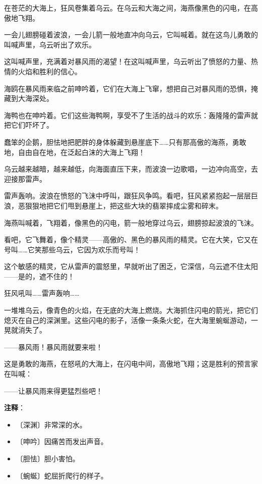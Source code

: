 \documentclass[12pt,UTF-8,openany]{ctexbook}
\begin{document}
\begin{normalsize}
    
    在苍茫的大海上，狂风卷集着乌云。在乌云和大海之间，海燕像黑色的闪电，在高傲地飞翔。
    
    一会儿翅膀碰着波浪，一会儿箭一般地直冲向乌云，它叫喊着。就在这鸟儿勇敢的叫喊声里，乌云听出了欢乐。
    
    这叫喊声里，充满着对暴风雨的渴望！在这叫喊声里，乌云听出了愤怒的力量、热情的火焰和胜利的信心。
    
    海鸥在暴风雨来临之前呻吟着，它们在大海上飞窜，想把自己对暴风雨的恐惧，掩藏到大海深处。
    
    海鸭也在呻吟着。它们这些海鸭啊，享受不了生活的战斗的欢乐：轰隆隆的雷声就把它们吓坏了。
    
    蠢笨的企鹅，胆怯地把肥胖的身体躲藏到悬崖底下……只有那高傲的海燕，勇敢地，自由自在地，在泛起白沫的大海上飞翔！
    
    乌云越来越暗，越来越低，向海面直压下来，而波浪一边歌唱，一边冲向高空，去迎接那雷声。
    
    雷声轰响。波浪在愤怒的飞沫中呼叫，跟狂风争鸣。看吧，狂风紧紧抱起一层层巨浪，恶狠狠地把它们甩到悬崖上，把这些大块的翡翠摔成尘雾和碎末。
    
    海燕叫喊着，飞翔着，像黑色的闪电，箭一般地穿过乌云，翅膀掠起波浪的飞沫。
    
    看吧，它飞舞着，像个精灵——高傲的、黑色的暴风雨的精灵。它在大笑，它又在号叫……它笑那些乌云，它因为欢乐而号叫！
    
    这个敏感的精灵，它从雷声的震怒里，早就听出了困乏，它深信，乌云遮不住太阳——是的，遮不住的！
    
    狂风吼叫……雷声轰响……
    
    一堆堆乌云，像青色的火焰，在无底的大海上燃烧。大海抓住闪电的箭光，把它们熄灭在自己的深渊里。这些闪电的影子，活像一条条火蛇，在大海里蜿蜒游动，一晃就消失了。
    
    ——暴风雨！暴风雨就要来啦！
    
    这是勇敢的海燕，在怒吼的大海上，在闪电中间，高傲地飞翔；这是胜利的预言家在叫喊：
    
    ——让暴风雨来得更猛烈些吧！
    
\end{normalsize}


\newpage

\textbf{注释}：

\vspace{-1em}

\begin{itemize}
    \setlength\itemsep{-0.2em}
    \item 〔深渊〕非常深的水。
    \item 〔呻吟〕因痛苦而发出声音。
    \item 〔胆怯〕胆小害怕。
    \item 〔蜿蜒〕蛇屈折爬行的样子。
\end{itemize}
\end{document}
